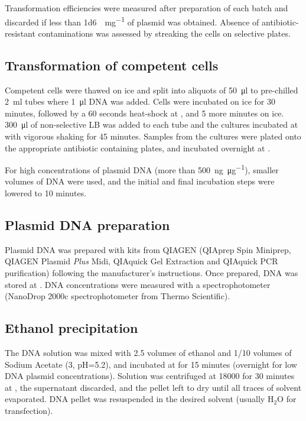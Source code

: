     Transformation efficiencies were measured after preparation of each batch and discarded
    if less than \SI{1d6}{\cfu\per\mg} of plasmid was obtained. Absence of antibiotic-resistant
    contaminations was assessed by streaking the cells on selective plates.

  \subsection{Transformation of competent cells}
    Competent cells were thawed on ice and split into aliquots of \SI{50}{\ul} to pre-chilled \SI{2}{\ml}
    tubes where \SI{1}{\ul} DNA was added. Cells were incubated on ice for 30 minutes, followed by a 60 seconds
    heat-shock at , and 5 more minutes on ice. \SI{300}{\ul} of non-selective LB was added to each tube
    and the cultures incubated at  with vigorous shaking for 45 minutes. Samples from the cultures
    were plated onto the appropriate antibiotic containing plates, and incubated overnight at .
    
    For high concentrations of plasmid DNA (more than \SI{500}{\ng\per\ug}), smaller volumes of DNA were used,
    and the initial and final incubation steps were lowered to 10 minutes.

  \subsection{Plasmid DNA preparation}
    Plasmid DNA was prepared with kits from QIAGEN (QIAprep Spin Miniprep, QIAGEN Plasmid \textit{Plus} Midi,
    QIAquick Gel Extraction and QIAquick PCR purification) following the manufacturer's instructions. Once
    prepared, DNA was stored at . DNA concentrations were measured with a spectrophotometer (NanoDrop
    2000c spectrophotometer from Thermo Scientific).

  \subsection{Ethanol precipitation}
    \label{sec:ethanol-precipitation}
    The DNA solution was mixed with \num{2.5} volumes of  ethanol and \num{1/10} volumes of
    Sodium Acetate (\SI{3}{\Molar}, pH=\num{5.2}), and incubated at  for 15 minutes (overnight for
    low DNA plasmid concentrations). Solution was centrifuged at \SI{18000}{\gn} for 30 minutes at ,
    the supernatant discarded, and the pellet left to dry until all traces of solvent evaporated. DNA pellet
    was resuspended in the desired solvent (usually H$_2$O for transfection).

